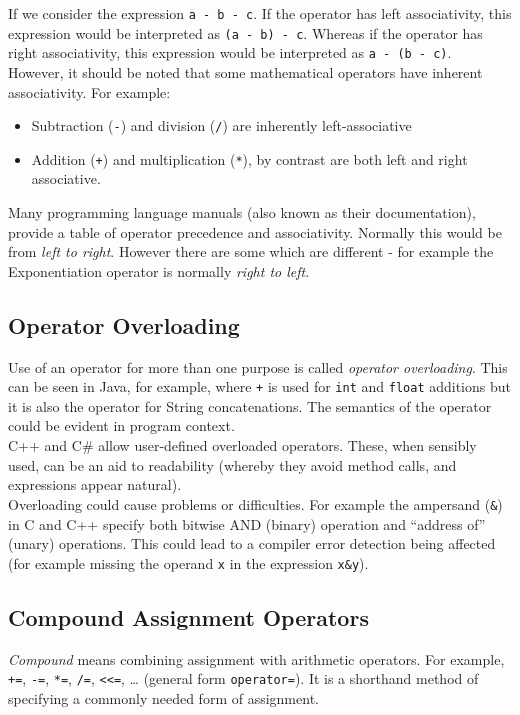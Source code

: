 If we consider the expression \verb|a - b - c|. If the operator has left associativity, this expression would be interpreted as \verb|(a - b) - c|. Whereas if the operator has right associativity, this expression would be interpreted as \verb|a - (b - c)|.\\

However, it should be noted that some mathematical operators have inherent associativity. For example:
\begin{itemize}
    \item Subtraction (\verb|-|) and division (\verb|/|) are inherently left-associative
    \item Addition (\verb|+|) and multiplication (\verb|*|), by contrast are both left and right associative.
\end{itemize}

Many programming language manuals (also known as their documentation), provide a table of operator precedence and associativity. Normally this would be from \textit{left to right}. However there are some which are different - for example the Exponentiation operator is normally \textit{right to left}. 

\subsection{Operator Overloading}
Use of an operator for more than one purpose is called \textit{operator overloading}. This can be seen in Java, for example, where \verb|+| is used for \verb|int| and \verb|float| additions but it is also the operator for String concatenations. The semantics of the operator could be evident in program context.\\

C++ and C\# allow user-defined overloaded operators. These, when sensibly used, can be an aid to readability (whereby they avoid method calls, and expressions appear natural).\\

Overloading could cause problems or difficulties. For example the ampersand (\verb|&|) in C and C++ specify both bitwise AND (binary) operation and ``address of'' (unary) operations. This could lead to a compiler error detection being affected (for example missing the operand \verb|x| in the expression \verb|x&y|). 

\subsection{Compound Assignment Operators}
\textit{Compound} means combining assignment with arithmetic operators. For example, \verb|+=|, \verb|-=|, \verb|*=|, \verb|/=|, \verb|<<=|, \dots{} (general form \verb|operator=|). It is a shorthand method of specifying a commonly needed form of assignment.\\

